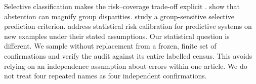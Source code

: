Selective classification makes the risk--coverage trade-off explicit \citep{geifman2017}. \citet{jones2021} show that abstention can magnify group disparities. \citet{lee2021} study a group-sensitive selective prediction criterion. \citet{angelopoulos2025} address statistical risk calibration for predictive systems on new examples under their stated assumptions. Our statistical question is different. We sample without replacement from a frozen, finite set of confirmations and verify the audit against its entire labelled census. This avoids relying on an independence assumption about errors within one article. We do not treat four repeated names as four independent confirmations.
